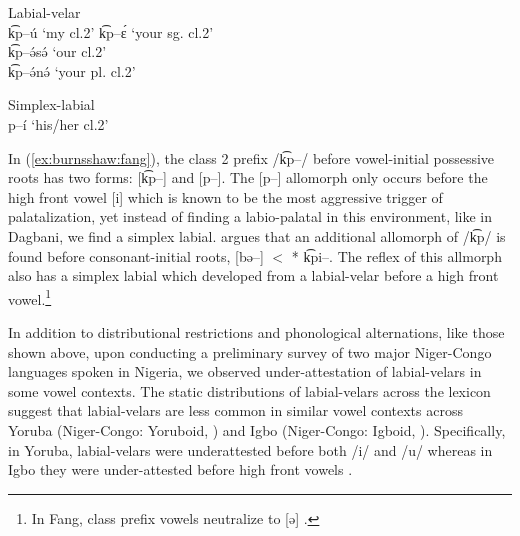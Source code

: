 \documentclass[output=paper,colorlinks,citecolor=brown
]{langscibook}
\begin{document}
\ea \label{ex:burnsshaw:fang}
\ea Labial-velar\\
    k͡p--ú   \tab ‘my cl.2’
    k͡p--ɛ́   \tab ‘your sg. cl.2’\\
    k͡p--ə́sə́ \tab ‘our cl.2’\\
    k͡p--ə́nə́ \tab ‘your pl. cl.2’

\ex Simplex-labial\\
    p--í \tab ‘his/her cl.2’\\


 \z
 \citep{Mve2019,Burns2023}
 \z

\noindent In (\ref{ex:burnsshaw:fang}), the class 2 prefix /k͡p--/ before vowel-initial possessive roots has two forms: [k͡p--] and [p--]. The [p--] allomorph only occurs before the high front vowel [i] which is known to be the most aggressive trigger of palatalization, yet instead of finding a labio-palatal in this environment, like in Dagbani, we find a simplex labial. \citet{Burns2023} argues that an additional allomorph of /k͡p/ is found before consonant-initial roots, [bə--] $<$ * k͡pi--. The reflex of this allmorph also has a simplex labial which developed from a labial-velar before a high front vowel.\footnote{In Fang, class prefix vowels neutralize to [ə] \citep[22]{Burns2023}.}

In addition to distributional restrictions and phonological alternations, like those shown above, upon conducting a preliminary survey of two major Niger-Congo languages spoken in Nigeria, we observed under-attestation of labial-velars in some vowel contexts. The static distributions of labial-velars across the lexicon suggest that labial-velars are less common in similar vowel contexts across Yoruba (Niger-Congo: Yoruboid, \citealt{University2001}) and Igbo (Niger-Congo: Igboid, \citealt{Echeruo1998, Igwe1999}). Specifically, in Yoruba, labial-velars were underattested before both /i/ and /u/ \citep{University2001} whereas in Igbo they were under-attested before high front vowels \citep{Echeruo1998, Igwe1999}.
\end{document}
